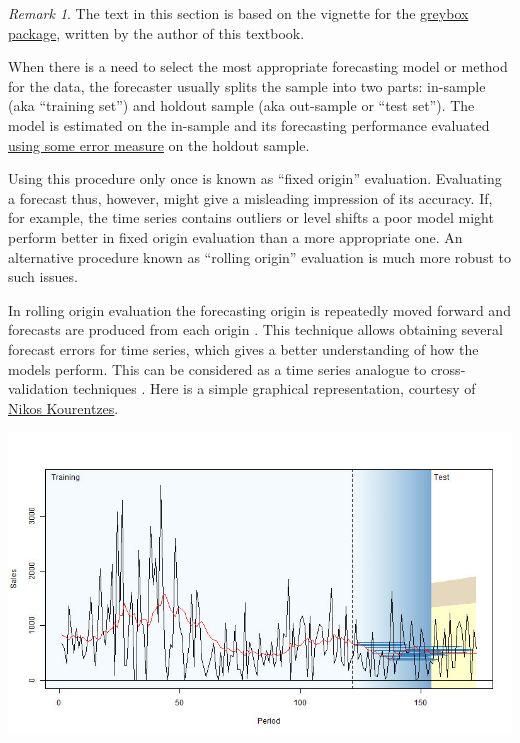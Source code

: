 \documentclass[
]{book}
\theoremstyle{definition}
\theoremstyle{definition}
\theoremstyle{definition}
\theoremstyle{definition}
\theoremstyle{remark}
\newtheorem*{remark}{Remark}
\begin{document}
\begin{remark}

The text in this section is based on the vignette for the \href{https://cran.r-project.org/package=greybox}{greybox package}, written by the author of this textbook.

\end{remark}

When there is a need to select the most appropriate forecasting model or method for the data, the forecaster usually splits the sample into two parts: in-sample (aka ``training set'') and holdout sample (aka out-sample or ``test set''). The model is estimated on the in-sample and its forecasting performance evaluated \protect\hyperlink{errorMeasures}{using some error measure} on the holdout sample.

Using this procedure only once is known as ``fixed origin'' evaluation. Evaluating a forecast thus, however, might give a misleading impression of its accuracy. If, for example, the time series contains outliers or level shifts a poor model might perform better in fixed origin evaluation than a more appropriate one. An alternative procedure known as ``rolling origin'' evaluation is much more robust to such issues.

In rolling origin evaluation the forecasting origin is repeatedly moved forward and forecasts are produced from each origin \citep{Tashman2000}. This technique allows obtaining several forecast errors for time series, which gives a better understanding of how the models perform. This can be considered as a time series analogue to cross-validation techniques \citep{WikipediaCrossValidation2020}. Here is a simple graphical representation, courtesy of \href{https://kourentzes.com/forecasting/}{Nikos Kourentzes}.

\includegraphics{./images/03-ROAnimation.jpg}
\end{document}
